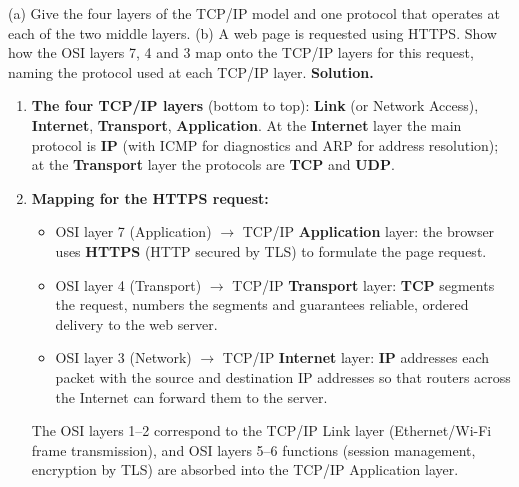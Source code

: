 \documentclass[11pt]{article}
\begin{document}
\begin{exoresolu}
(a) Give the four layers of the TCP/IP model and one protocol that operates at each of the two middle layers. (b) A web page is requested using HTTPS. Show how the OSI layers 7, 4 and 3 map onto the TCP/IP layers for this request, naming the protocol used at each TCP/IP layer.
\tcblower
\textbf{Solution.}
\begin{enumerate}
\item \textbf{The four TCP/IP layers} (bottom to top): \textbf{Link} (or Network Access), \textbf{Internet}, \textbf{Transport}, \textbf{Application}. At the \textbf{Internet} layer the main protocol is \textbf{IP} (with ICMP for diagnostics and ARP for address resolution); at the \textbf{Transport} layer the protocols are \textbf{TCP} and \textbf{UDP}.
\item \textbf{Mapping for the HTTPS request:}
\begin{itemize}
\item OSI layer 7 (Application) $\rightarrow$ TCP/IP \textbf{Application} layer: the browser uses \textbf{HTTPS} (HTTP secured by TLS) to formulate the page request.
\item OSI layer 4 (Transport) $\rightarrow$ TCP/IP \textbf{Transport} layer: \textbf{TCP} segments the request, numbers the segments and guarantees reliable, ordered delivery to the web server.
\item OSI layer 3 (Network) $\rightarrow$ TCP/IP \textbf{Internet} layer: \textbf{IP} addresses each packet with the source and destination IP addresses so that routers across the Internet can forward them to the server.
\end{itemize}
The OSI layers 1--2 correspond to the TCP/IP Link layer (Ethernet/Wi-Fi frame transmission), and OSI layers 5--6 functions (session management, encryption by TLS) are absorbed into the TCP/IP Application layer.
\end{enumerate}
\end{exoresolu}
\end{document}
